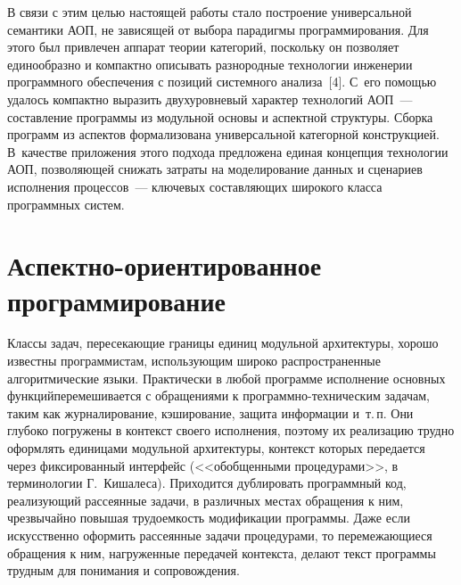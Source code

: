 \begin{multicols}{2}
   В связи с этим целью настоящей работы стало построение универсальной 
семантики АОП, не зависящей от выбора парадигмы программирования. Для 
этого был привлечен аппарат теории категорий, поскольку он позволяет 
единообразно и компактно описывать разнородные технологии инженерии 
программного обеспечения с позиций системного анализа~[4]. С~его помощью 
удалось компактно выразить двухуровневый характер технологий АОП~--- 
составление программы из модульной основы и аспектной структуры. Сборка 
программ из аспектов формализована универсальной категорной конструкцией. 
В~качестве приложения этого подхода предложена единая концепция 
технологии АОП, позволяющей снижать затраты на моделирование данных и 
сценариев исполнения процессов~--- ключевых составляющих широкого класса 
программных сис\-тем.

\section{Аспектно-ориентированное программирование}

   Классы задач, пересекающие границы единиц модульной архитектуры, 
хорошо известны программистам, использующим широко распространенные 
алгоритмические языки. Практически в любой программе исполнение 
основных функций\linebreak перемешивается с обращениями к 
   про\-грам\-мно-тех\-ни\-че\-ским задачам, таким как журналирование,\linebreak 
кэширование, защита информации и~т.\,п. Они глубоко погружены в контекст 
своего исполнения, поэтому их реализацию трудно оформлять единицами 
модульной архитектуры, контекст которых передается через фиксированный 
интерфейс (<<обобщенными процедурами>>, в терминологии Г.~Кишалеса). 
Приходится дублировать программный код, реализующий рассеянные задачи, в 
различных мес\-тах обращения к ним, чрезвычайно повышая трудоемкость 
модификации программы. Даже если искусственно оформить рассеянные 
задачи процедурами, то перемежающиеся обращения к ним, нагруженные 
передачей контекста, делают текст программы трудным для понимания и 
сопровождения.
   

\end{multicols}
